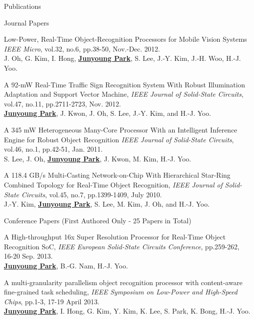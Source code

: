 \documentclass{resume} %
\begin{document}
\begin{section}{Publications}
\begin{subsection}{Journal Papers}{}{}{}
\item Low-Power, Real-Time Object-Recognition Processors for Mobile Vision Systems \emph{IEEE Micro}, vol.32, no.6, pp.38-50, Nov.-Dec. 2012. \\
{\small J. Oh, G. Kim, I. Hong, \underline{\bf Junyoung Park}, S. Lee, J.-Y. Kim, J.-H. Woo, H.-J. Yoo.}

\item A 92-mW Real-Time Traffic Sign Recognition System With Robust Illumination Adaptation and Support Vector Machine, \emph{IEEE Journal of Solid-State Circuits}, vol.47, no.11, pp.2711-2723, Nov. 2012. \\
{\small \underline{\bf Junyoung Park}, J. Kwon, J. Oh, S. Lee, J.-Y. Kim, and H.-J. Yoo.}

\item A 345 mW Heterogeneous Many-Core Processor With an Intelligent Inference Engine for Robust Object Recognition \emph{IEEE Journal of Solid-State Circuits}, vol.46, no.1, pp.42-51, Jan. 2011. \\
{\small S. Lee, J. Oh, \underline{\bf Junyoung Park}, J. Kwon, M. Kim, H.-J. Yoo.}

\item A 118.4 GB/s Multi-Casting Network-on-Chip With Hierarchical Star-Ring Combined Topology for Real-Time Object Recognition, \emph{IEEE Journal of Solid-State Circuits}, vol.45, no.7, pp.1399-1409, July 2010. \\
{\small J.-Y. Kim, \underline{\bf Junyoung Park}, S. Lee, M. Kim, J. Oh, and H.-J. Yoo.}

\end{subsection}

\begin{subsection}{Conference Papers (First Authored Only - 25 Papers in Total)}{}{}{}

\item A High-throughput 16x Super Resolution Processor for Real-Time Object Recognition SoC, \emph{IEEE European Solid-State Circuits Conference}, pp.259-262, 16-20 Sep. 2013. \\
{\small \underline{\bf Junyoung Park}, B.-G. Nam, H.-J. Yoo.}

\item A multi-granularity parallelism object recognition processor with content-aware fine-grained task scheduling, \emph{IEEE Symposium on Low-Power and High-Speed Chips}, pp.1-3, 17-19 April 2013. \\
{\small \underline{\bf Junyoung Park}, I. Hong, G. Kim, Y. Kim, K. Lee, S. Park, K. Bong, H.-J. Yoo.}


\end{subsection}
\end{section}
\end{document}
